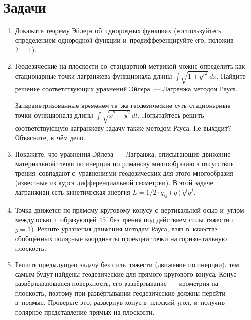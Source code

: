 \documentclass[a4paper,11pt]{article}
\newcommand\slashfrac[2]{{#1/#2}}
\theoremstyle{definition}
\begin{document}
\section{Задачи}

\begin{enumerate}

\item
Докажите теорему Эйлера об~однородных функциях (воспользуйтесь определением
однородной функции и~продифференцируйте его, положив $\lambda=1$).

\item
Геодезические на плоскости со~стандартной метрикой можно определить как
стационарные точки лагранжева функционала длины $\int\sqrt{1+y'^2}\,dx$. Найдите
решение соответствующих уравнений Эйлера~— Лагранжа методом Рауса.

Запараметризованные временем те~же геодезические суть стационарные точки
функционала длины $\int\sqrt{\dot x^2+\dot y^2}\,dt$. Попытайтесь решить
соответствующую лагранжеву задачу также методом Рауса. Не выходит? Объясните,
в~чём дело.

\item
Покажите, что уравнения Эйлера~— Лагранжа, описывающие движение материальной
точки по инерции по риманову многообразию в отсутствие трения, совпадают
с~уравнениями геодезических для этого многообразия (известные из курса
дифференциальной геометрии). В этой задаче лагранжиан есть кинетическая энергия
$L=\slashfrac12\cdot g_{ij}(q)\dot q^i\dot q^j$.

\item
Точка движется по прямому круговому конусу с~вертикальной осью и~углом между
осью и~образующей $45^\circ$ без трения под действием силы тяжести ($g=1$).
Решите уравнения движения методом Рауса, взяв в~качестве обобщённых полярные
координаты проекции точки на горизонтальную плоскость.

\item
Решите предыдущую задачу без силы тяжести (движение по инерции), тем самым
будут найдены геодезические для прямого кругового конуса. Конус~—
развёртывающаяся поверхность, его развёртывание~— изометрия на плоскость,
поэтому при развёртывании геодезические должны перейти в~прямые. Проверьте это,
развернув конус в~плоский угол, и~получив полярное представление прямых на
плоскости.

\end{enumerate}
\end{document}
